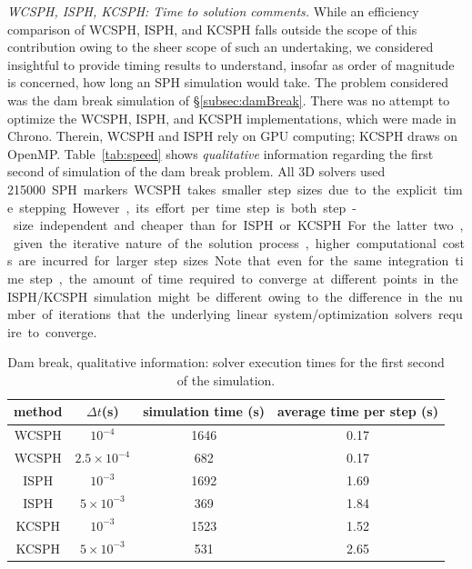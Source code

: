 \vspace{3pt}

\noindent \textit{WCSPH, ISPH, KCSPH: Time to solution comments.}
While an efficiency comparison of WCSPH, ISPH, and KCSPH falls outside the scope of this contribution owing to the sheer scope of such an undertaking, we considered insightful to provide timing results to understand, insofar as order of magnitude is concerned, how long an SPH simulation would take. The problem considered was the dam break simulation of \S\ref{subsec:damBreak}. There was no attempt to optimize the WCSPH, ISPH, and KCSPH implementations, which were made in Chrono. Therein, WCSPH and ISPH rely on GPU computing; KCSPH draws on OpenMP. %
Table~\ref{tab:speed} shows {\textit{qualitative}} information regarding the first second of simulation of the dam break problem. All 3D solvers used \SI{215000} SPH markers. WCSPH takes smaller step sizes due to the explicit time stepping. However, its effort per time step is both step-size independent and cheaper than for ISPH or KCSPH. For the latter two, given the iterative nature of the solution process, higher computational costs are incurred for larger step sizes. Note that even for the same integration time step, the amount of time required to converge at different points in the ISPH/KCSPH simulation might be different owing to the difference in the number of iterations that the underlying linear system/optimization solvers require to converge. 
\begin{table}\centering
	\begin{tabular}{cccc}
		\toprule
		
		method & $\Delta t$(\si{s}) &  simulation time (\si{s}) & average time per step (\si{s})\\
		\midrule
		
		WCSPH & $10^{-4}$ & 1646 & 0.17 \\
		WCSPH & $2.5\times 10^{-4}$ & 682 & 0.17 \\
		ISPH & $10^{-3}$ & 1692 & 1.69 \\
		ISPH & $5\times 10^{-3}$ & 369 & 1.84 \\
		
		KCSPH & $10^{-3}$ & 1523 & 1.52 \\
		KCSPH & $5\times 10^{-3}$ & 531 & 2.65 \\
		\bottomrule
	\end{tabular}
	\caption{Dam break, qualitative information: solver execution times for the first second of the simulation.}
\end{table}\label{tab:speed}

